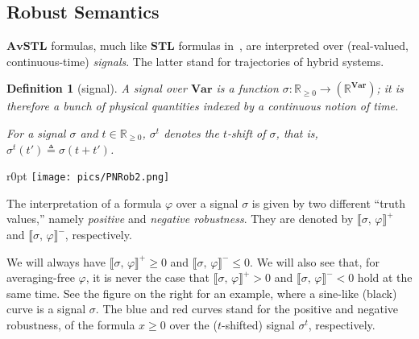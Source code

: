 \documentclass[envcountsect,orivec]{llncs} \usepackage{etex} \usepackage[]{graphicx}
\newtheorem{mydefinition}[mytheorem]{Definition}
\newcommand{\R}{{\mathbb{R}}}
\newcommand{\Var}{\mathbf{Var}}
\newcommand{\STL}{\textbf{STL}}
\newcommand{\Robust}[2]{{ \llbracket #1,\, #2 \rrbracket}}
\newcommand{\Defeq}{\triangleq}
\newcommand{\AvSTL}{\textbf{AvSTL}}
\newcommand{\Rnn}{\R_{\ge 0}}
\begin{document}
\subsection{Robust Semantics}\label{subsec:semantics}
 $\AvSTL$ formulas, much like  $\STL$ formulas in~\cite{DBLP:journals/tcs/FainekosP09,DBLP:conf/formats/DonzeM10}, are interpreted over 
(real-valued, continuous-time) \emph{signals}. The latter stand for
trajectories of hybrid systems.
\begin{mydefinition}[signal]\label{def:signal}
A \emph{signal} over $\Var$ is a function $\sigma\colon
  \Rnn\to (\R^{\Var})$; it is therefore a bunch of physical quantities indexed
  by a continuous notion of time.

For a signal $\sigma$  and $t\in \Rnn$,
 $\sigma^t$ denotes the \emph{$t$-shift} of $\sigma$, that is,
$\sigma^t(t') \Defeq \sigma(t+t')$.


\end{mydefinition}

\begin{wrapfigure}[5]{r}{0pt}
\centering
\texttt{[image: pics/PNRob2.png]}
\end{wrapfigure}
The interpretation of a formula $\varphi$ over a signal $\sigma$ is given by two different 
``truth values,'' namely \emph{positive} and \emph{negative robustness}.
They are denoted by $      \Robust{\sigma}{\varphi}^{+}$ and 
 $      \Robust{\sigma}{\varphi}^{-}$, respectively. 

We will always have
\begin{math}
 \Robust{\sigma}{\varphi}^{+} \ge 0
\end{math} and
\begin{math}
 \Robust{\sigma}{\varphi}^{-} \le 0
\end{math}.
We will also see that, for averaging-free $\varphi$,
it is never the case that
\begin{math}
  \Robust{\sigma}{\varphi}^{+} > 0
\end{math}
and
\begin{math}
 \Robust{\sigma}{\varphi}^{-} <0
\end{math}
hold at the same time. 
See the figure on the right for an example, where a sine-like (black) curve is
a signal $\sigma$. The blue and red curves stand for the positive and
negative robustness, of the formula $x\ge 0$ over the ($t$-shifted) signal
$\sigma^{t}$, respectively.
\end{document}
